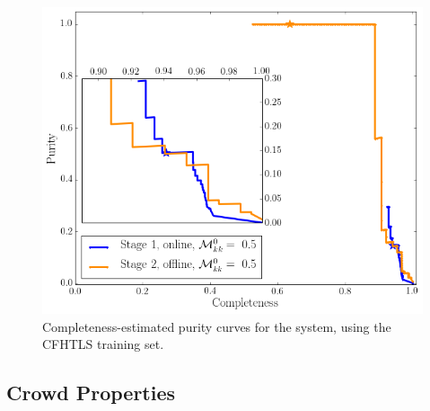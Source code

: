 \documentclass[useAMS,usenatbib,a4paper]{mn2e}
\begin{document}

\begin{figure}
\centering\includegraphics[width=\linewidth]{sw-system-figs/completeness_purity_simple.png}
\caption{Completeness-estimated purity curves for the \sw system, using
the CFHTLS training set.}
\label{fig:results:sample:CP}
\end{figure}


\subsection{Crowd Properties}
\label{sec:results:crowd}
\end{document}
